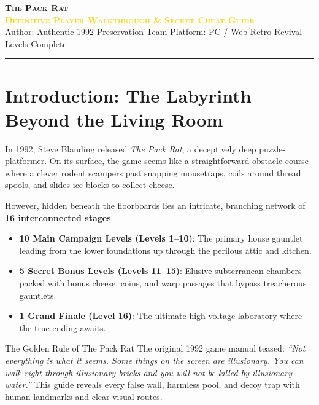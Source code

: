 \documentclass[10pt,letterpaper]{article}
\begin{document}
\begin{center}
    {\Huge\textbf{\textsc{\textcolor{cobalt}{The Pack Rat}}}}\\[2pt]
    {\large\textbf{\textsc{\textcolor{gold}{Definitive Player Walkthrough \& Secret Cheat Guide}}}}\\[3pt]
    {\small Author: Authentic 1992 Preservation Team \quad\textbullet\quad Platform: PC / Web Retro Revival \quad\textbullet{} Levels Complete}\\[5pt]
    \rule{\linewidth}{1.2pt}
\end{center}

\vspace{-0.7em}

\section{Introduction: The Labyrinth Beyond the Living Room}
In 1992, Steve Blanding released \emph{The Pack Rat}, a deceptively deep puzzle-platformer. On its surface, the game seems like a straightforward obstacle course where a clever rodent scampers past snapping mousetraps, coils around thread spools, and slides ice blocks to collect cheese. 

However, hidden beneath the floorboards lies an intricate, branching network of \textbf{16 interconnected stages}:
\begin{itemize}[noitemsep,topsep=1pt]
    \item \textbf{10 Main Campaign Levels (Levels 1--10)}: The primary house gauntlet leading from the lower foundations up through the perilous attic and kitchen.
    \item \textbf{5 Secret Bonus Levels (Levels 11--15)}: Elusive subterranean chambers packed with bonus cheese, coins, and warp passages that bypass treacherous gauntlets.
    \item \textbf{1 Grand Finale (Level 16)}: The ultimate high-voltage laboratory where the true ending awaits.
\end{itemize}

\begin{tipbox}{The Golden Rule of The Pack Rat}
The original 1992 game manual teased: \emph{“Not everything is what it seems. Some things on the screen are illusionary. You can walk right through illusionary bricks and you will not be killed by illusionary water.”} This guide reveals every false wall, harmless pool, and decoy trap with human landmarks and clear visual routes.
\end{tipbox}
\end{document}
